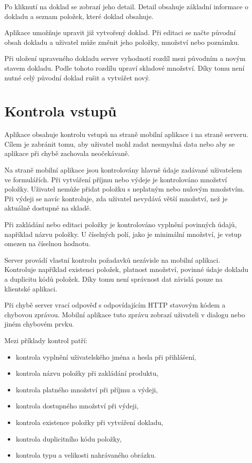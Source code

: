 \documentclass[czech, oth, kiv, he, pdf, viewonly]{fasthesis}
\begin{document}
Po kliknutí na doklad se zobrazí jeho detail. Detail obsahuje základní
informace o dokladu a seznam položek, které doklad obsahuje.

Aplikace umožňuje upravit již vytvořený doklad. Při editaci se načte
původní obsah dokladu a uživatel může změnit jeho položky, množství
nebo poznámku.

Při uložení upraveného dokladu server vyhodnotí rozdíl mezi původním
a novým stavem dokladu. Podle tohoto rozdílu upraví skladové množství.
Díky tomu není nutné celý původní doklad rušit a vytvářet nový.

\chapter{Kontrola vstupů}

Aplikace obsahuje kontrolu vstupů na straně mobilní aplikace i na
straně serveru. Cílem je zabránit tomu, aby uživatel mohl zadat
nesmyslná data nebo aby se aplikace při chybě zachovala neočekávaně.

Na straně mobilní aplikace jsou kontrolovány hlavně údaje zadávané
uživatelem ve formulářích. Při vytváření příjmu nebo výdeje je
kontrolováno množství položky. Uživatel nemůže přidat položku
s neplatným nebo nulovým množstvím. Při výdeji se navíc kontroluje,
zda uživatel nevydává větší množství, než je aktuálně dostupné na
skladě.

Při zakládání nebo editaci položky je kontrolováno vyplnění povinných
údajů, například názvu položky. U číselných polí, jako je minimální
množství, je vstup omezen na číselnou hodnotu.

Server provádí vlastní kontrolu požadavků nezávisle na mobilní
aplikaci. Kontroluje například existenci položek, platnost množství,
povinné údaje dokladu a duplicitu kódů položek. Díky tomu není
správnost dat závislá pouze na klientské aplikaci.

Při chybě server vrací odpověď s odpovídajícím HTTP stavovým kódem
a chybovou zprávou. Mobilní aplikace tuto zprávu zobrazí uživateli
v dialogu nebo jiném chybovém prvku.

Mezi příklady kontrol patří:

\begin{itemize}
    \item kontrola vyplnění uživatelského jména a hesla při přihlášení,
    \item kontrola názvu položky při zakládání produktu,
    \item kontrola platného množství při příjmu a výdeji,
    \item kontrola dostupného množství při výdeji,
    \item kontrola existence položky při vytváření dokladu,
    \item kontrola duplicitního kódu položky,
    \item kontrola typu a velikosti nahrávaného obrázku.
\end{itemize}
\end{document}
